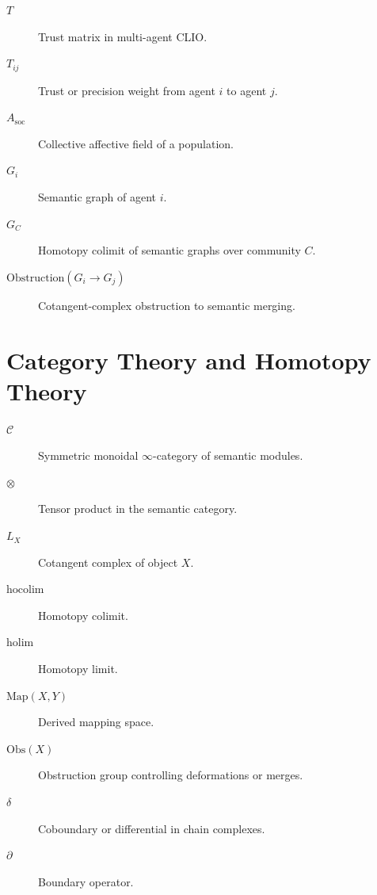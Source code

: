 \documentclass[12pt,oneside]{book}
\theoremstyle{plain}
\theoremstyle{definition}
\def\mathbb#1{#1}%
\begin{document}
\begin{description}

  \item[$T$] Trust matrix in multi-agent CLIO.

  \item[$T_{ij}$] Trust or precision weight from agent $i$ to agent $j$.

  \item[$A_{\mathrm{soc}}$] Collective affective field of a population.

  \item[$G_i$] Semantic graph of agent $i$.

  \item[$G_C$] Homotopy colimit of semantic graphs over community $C$.

  \item[$\mathrm{Obstruction}(G_i \to G_j)$] Cotangent-complex obstruction to semantic merging.

\end{description}

\section{Category Theory and Homotopy Theory}

\begin{description}

  \item[$\mathcal{C}$] Symmetric monoidal $\infty$-category of semantic modules.

  \item[$\otimes$] Tensor product in the semantic category.

  \item[$\mathbb{L}_{X}$] Cotangent complex of object $X$.

  \item[$\mathrm{hocolim}$] Homotopy colimit.

  \item[$\mathrm{holim}$] Homotopy limit.

  \item[$\mathrm{Map}(X,Y)$] Derived mapping space.

  \item[$\mathrm{Obs}(X)$] Obstruction group controlling deformations or merges.

  \item[$\delta$] Coboundary or differential in chain complexes.

  \item[$\partial$] Boundary operator.

\end{description}
\end{document}

